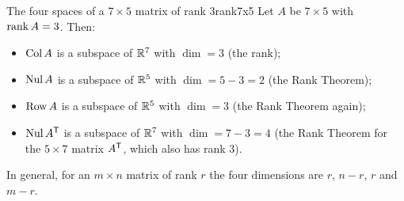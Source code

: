 \documentclass[11pt]{article}
\begin{document}
\begin{exmp}{The four spaces of a $7\times5$ matrix of rank $3$}{rank7x5}
Let $A$ be $7\times5$ with $\operatorname{rank} A=3$. Then:
\begin{itemize}
  \item $\operatorname{Col} A$ is a subspace of $\mathbb{R}^7$ with $\dim=3$ (the rank);
  \item $\operatorname{Nul} A$ is a subspace of $\mathbb{R}^5$ with $\dim=5-3=2$ (the Rank Theorem);
  \item $\operatorname{Row} A$ is a subspace of $\mathbb{R}^5$ with $\dim=3$ (the Rank Theorem again);
  \item $\operatorname{Nul} A^{\mathsf T}$ is a subspace of $\mathbb{R}^7$ with $\dim=7-3=4$ (the Rank Theorem for the $5\times7$ matrix $A^{\mathsf T}$, which also has rank $3$).
\end{itemize}
In general, for an $m\times n$ matrix of rank $r$ the four dimensions are $r$, $n-r$, $r$ and $m-r$.
\end{exmp}
\end{document}
